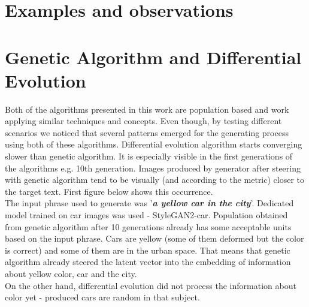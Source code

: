 \documentclass[12pt,a4paper,openany]{book}
\begin{document}
\section{Examples and observations}

\section{Genetic Algorithm and Differential Evolution}

\noindent Both of the algorithms presented in this work are population based and work applying similar techniques and concepts. Even though, by testing different scenarios we noticed that several patterns emerged for the generating process using both of these algorithms. 
Differential evolution algorithm starts converging slower than genetic algorithm. It is especially visible in the first generations of the algorithms e.g. 10th generation. Images produced by generator after steering with genetic algorithm tend to be visually (and according to the metric) closer to the target text. First figure below shows this occurrence.\\
The input phrase used to generate was '\textit{\textbf{a yellow car in the city}}'. Dedicated model trained on car images was used - StyleGAN2-car. Population obtained from genetic algorithm after 10 generations already has some acceptable units based on the input phrase. Cars are yellow (some of them deformed but the color is correct) and some of them are in the urban space. That means that genetic algorithm already steered the latent vector into the embedding of information about yellow color, car and the city.\\
On the other hand, differential evolution did not process the information about color yet - produced cars are random in that subject.

\newpage
\end{document}
